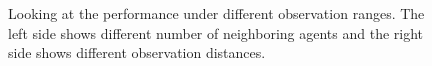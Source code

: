 \begin{figure}[htp]
    \centering
    \hspace{1cm}                       
    \caption{Looking at the performance under different observation ranges. The left side shows different number of neighboring agents and the right side shows different observation distances.}
    \label{fig:observation-knnvsdistance}
\end{figure}


